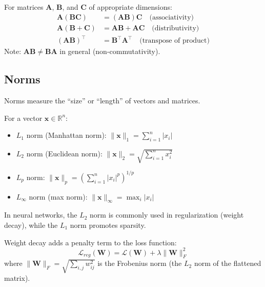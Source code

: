 \begin{property}
For matrices $\mathbf{A}$, $\mathbf{B}$, and $\mathbf{C}$ of appropriate dimensions:
\begin{align}
\mathbf{A}(\mathbf{BC}) &= (\mathbf{AB})\mathbf{C} \quad \text{(associativity)} \\
\mathbf{A}(\mathbf{B} + \mathbf{C}) &= \mathbf{AB} + \mathbf{AC} \quad \text{(distributivity)} \\
(\mathbf{AB})^\top &= \mathbf{B}^\top \mathbf{A}^\top \quad \text{(transpose of product)}
\end{align}
Note: $\mathbf{AB} \neq \mathbf{BA}$ in general (non-commutativity).
\end{property}

\subsection{Norms}

Norms measure the ``size'' or ``length'' of vectors and matrices.

\begin{definition}
For a vector $\mathbf{x} \in \mathbb{R}^n$:
\begin{itemize}
    \item $L_1$ norm (Manhattan norm): $\|\mathbf{x}\|_1 = \sum_{i=1}^{n} |x_i|$
    \item $L_2$ norm (Euclidean norm): $\|\mathbf{x}\|_2 = \sqrt{\sum_{i=1}^{n} x_i^2}$
    \item $L_p$ norm: $\|\mathbf{x}\|_p = \left(\sum_{i=1}^{n} |x_i|^p\right)^{1/p}$
    \item $L_\infty$ norm (max norm): $\|\mathbf{x}\|_\infty = \max_i |x_i|$
\end{itemize}
\end{definition}

In neural networks, the $L_2$ norm is commonly used in regularization (weight decay), while the $L_1$ norm promotes sparsity.

\begin{example}
Weight decay adds a penalty term to the loss function:
\begin{equation}
\mathcal{L}_{reg}(\mathbf{W}) = \mathcal{L}(\mathbf{W}) + \lambda \|\mathbf{W}\|_F^2
\end{equation}
where $\|\mathbf{W}\|_F = \sqrt{\sum_{i,j} w_{ij}^2}$ is the Frobenius norm (the $L_2$ norm of the flattened matrix).
\end{example}

